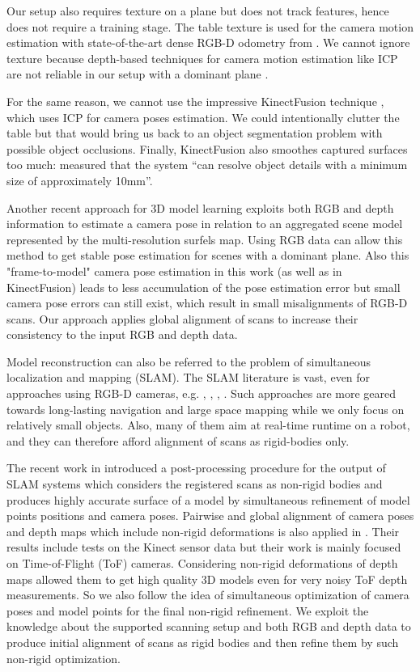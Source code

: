 \documentclass[letterpaper, 10 pt, conference]{ieeeconf}  %
\begin{document}
Our setup also requires 
texture on a plane but does not track features, hence does not require a training stage.
The table texture is used for the camera motion estimation 
with state-of-the-art dense RGB-D odometry from \cite{steinbrucker2011real}.
We cannot ignore texture because depth-based
techniques for camera motion estimation like ICP \cite{besl1992method} 
are not reliable in our setup with a dominant plane \cite{rusinkiewicz2001efficient}.


For the same reason, we cannot use
the impressive KinectFusion technique \cite{newcombe2011kinectfusion},
which uses ICP for camera poses estimation.
We could intentionally clutter the table but that would bring us back to
an object segmentation problem with possible object occlusions.
Finally, KinectFusion also smoothes captured surfaces too much: \cite{meister2012when} measured that
the system ``can resolve object details with a minimum size of approximately 10mm''.

Another recent approach \cite{stuckler2012model} for 3D model learning 
exploits both RGB and depth information to estimate a camera pose 
in relation to an aggregated scene model represented by the multi-resolution surfels map.
Using RGB data can allow this method to get stable pose estimation
for scenes with a dominant plane. Also this "frame-to-model" camera pose estimation 
in this work (as well as in KinectFusion) leads to less accumulation of the pose estimation error
but small camera pose errors can still exist, which result in
small misalignments of RGB-D scans. Our approach applies global alignment of scans
to increase their consistency to the input RGB and depth data.

Model reconstruction can also be referred to the problem of simultaneous localization
and mapping (SLAM). The SLAM literature is vast, even for approaches using RGB-D
cameras, e.g. \cite{stuckler2012integrating},
\cite{endres2012evaluation}, \cite{henry2012rgb}, \cite{strasdat2011double}. Such approaches are more geared
towards long-lasting navigation and large space mapping while we only focus on relatively small objects.
Also, many of them aim at
real-time runtime on a robot, and they can therefore afford alignment of scans 
as rigid-bodies only. 

The recent work in \cite{ruhnke2012highly} introduced a post-processing procedure for the output of SLAM systems
which considers the registered scans as non-rigid bodies and produces highly accurate
surface of a model by simultaneous refinement of model points positions and camera poses.
Pairwise and global alignment of camera poses and depth maps which include non-rigid 
deformations is also applied in \cite{cui2012algorithms}. Their results include tests on the Kinect
sensor data but their work is mainly focused on Time-of-Flight (ToF) cameras. Considering non-rigid deformations 
of depth maps allowed them to get high quality 3D models even for very noisy ToF depth measurements.
So we also follow the idea of simultaneous optimization of camera poses and model points 
for the final non-rigid refinement. We exploit the knowledge 
about the supported scanning setup and both RGB and depth 
data to produce initial alignment of scans as rigid bodies
and then refine them by such non-rigid optimization.
\end{document}
